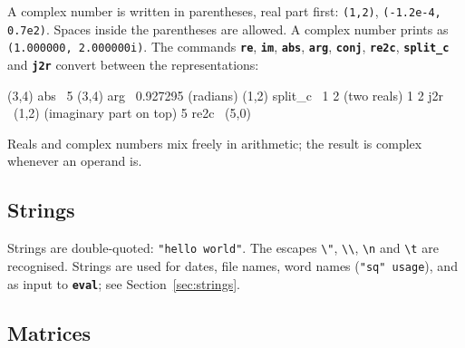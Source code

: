 \documentclass[11pt,letterpaper]{article}
\newcommand{\code}[1]{\texttt{#1}}
\newcommand{\cmd}[1]{\texttt{\textbf{#1}}}
\begin{document}
A complex number is written in parentheses, real part first: \code{(1,2)}, \code{(-1.2e-4, 0.7e2)}. Spaces inside the parentheses are allowed. A complex number prints as \code{(1.000000, 2.000000i)}. The commands \cmd{re}, \cmd{im}, \cmd{abs}, \cmd{arg}, \cmd{conj}, \cmd{re2c}, \cmd{split\_c} and \cmd{j2r} convert between the representations:
\begin{rpn}
(3,4) abs        \ 5
(3,4) arg        \ 0.927295  (radians)
(1,2) split_c    \ 1 2       (two reals)
1 2 j2r          \ (1,2)     (imaginary part on top)
5 re2c           \ (5,0)
\end{rpn}
Reals and complex numbers mix freely in arithmetic; the result is complex whenever an operand is.

\subsection{Strings}

Strings are double-quoted: \code{"hello world"}. The escapes \code{\textbackslash"}, \code{\textbackslash\textbackslash}, \code{\textbackslash n} and \code{\textbackslash t} are recognised. Strings are used for dates, file names, word names (\code{"sq" usage}), and as input to \cmd{eval}; see Section~\ref{sec:strings}.

\subsection{Matrices}
\end{document}
